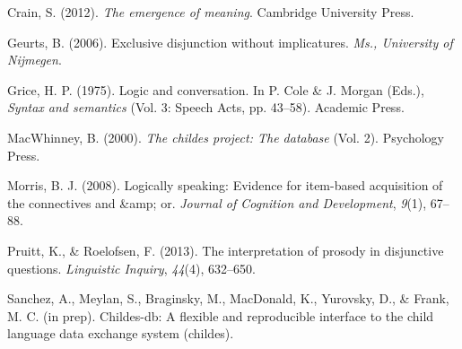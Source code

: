 \documentclass[10pt, letterpaper]{article}
\begin{document}
\hypertarget{ref-crain2012emergence}{}
Crain, S. (2012). \emph{The emergence of meaning}. Cambridge University
Press.

\hypertarget{ref-geurts2006exclusive}{}
Geurts, B. (2006). Exclusive disjunction without implicatures.
\emph{Ms., University of Nijmegen}.

\hypertarget{ref-grice1975logicconvo}{}
Grice, H. P. (1975). Logic and conversation. In P. Cole \& J. Morgan
(Eds.), \emph{Syntax and semantics} (Vol. 3: Speech Acts, pp. 43--58).
Academic Press.

\hypertarget{ref-macwhinney2000childes}{}
MacWhinney, B. (2000). \emph{The childes project: The database} (Vol.
2). Psychology Press.

\hypertarget{ref-morris2008logically}{}
Morris, B. J. (2008). Logically speaking: Evidence for item-based
acquisition of the connectives and \&amp; or. \emph{Journal of Cognition
and Development}, \emph{9}(1), 67--88.

\hypertarget{ref-pruitt2013interpretation}{}
Pruitt, K., \& Roelofsen, F. (2013). The interpretation of prosody in
disjunctive questions. \emph{Linguistic Inquiry}, \emph{44}(4),
632--650.

\hypertarget{ref-childesdb}{}
Sanchez, A., Meylan, S., Braginsky, M., MacDonald, K., Yurovsky, D., \&
Frank, M. C. (in prep). Childes-db: A flexible and reproducible
interface to the child language data exchange system (childes).
\end{document}
